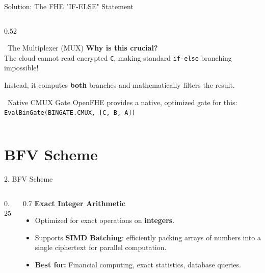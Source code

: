 \documentclass[aspectratio=169, 10pt]{beamer}
\begin{document}
\begin{frame}[fragile]{Solution: The FHE "IF-ELSE" Statement}
\begin{columns}[T]
\begin{column}{0.52\textwidth}
\begin{exampleblock}{\faLightbulb \ The Multiplexer (MUX)}
        \textbf{Why is this crucial?} \\
        The cloud cannot read encrypted \texttt{C}, making standard \texttt{if-else} branching impossible! 
        \vspace{0.1cm}
        
        Instead, it computes \textbf{both} branches and mathematically filters the result.
    \end{exampleblock}
    
    \begin{alertblock}{\faMicrochip \ Native CMUX Gate}
        \vspace*{0.5ex}
        \footnotesize
        OpenFHE provides a native, optimized gate for this: \\
        \texttt{EvalBinGate(BINGATE.CMUX, [C, B, A])}
    \end{alertblock}
\end{column}

\end{columns}
\end{frame}

\section{BFV Scheme}
\begin{frame}{2. BFV Scheme}
\begin{columns}[T]
\begin{column}{0.25\textwidth}
    \vspace{0.5cm}
    \centering
    \textcolor{DeepBlue}{\Huge \faCalculator} \\ \vspace{0.3cm}
    \textcolor{AccentOrange}{\Large \faListOl}
\end{column}
\begin{column}{0.7\textwidth}
    \Large \textbf{Exact Integer Arithmetic} \\
    \normalsize \vspace{0.3cm}
    \begin{itemize}
        \item Optimized for exact operations on \textbf{integers}.
        \item Supports \textbf{SIMD Batching}: efficiently packing arrays of numbers into a single ciphertext for parallel computation.
        \item \textbf{Best for:} Financial computing, exact statistics, database queries.
    \end{itemize}
\end{column}
\end{columns}
\end{frame}
\end{document}
